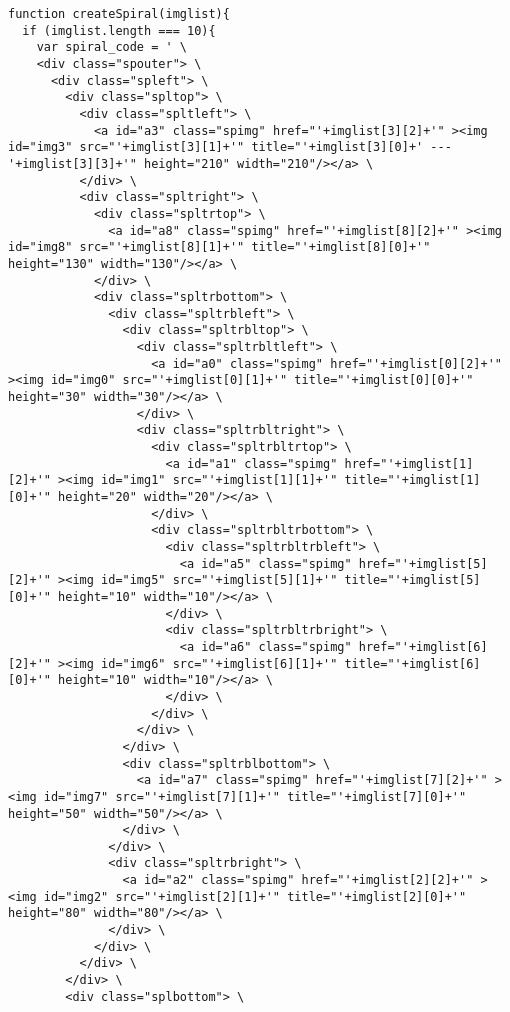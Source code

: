 \begin{verbatim}
function createSpiral(imglist){
  if (imglist.length === 10){
    var spiral_code = ' \
    <div class="spouter"> \
      <div class="spleft"> \
        <div class="spltop"> \
          <div class="spltleft"> \
            <a id="a3" class="spimg" href="'+imglist[3][2]+'" ><img id="img3" src="'+imglist[3][1]+'" title="'+imglist[3][0]+' --- '+imglist[3][3]+'" height="210" width="210"/></a> \
          </div> \
          <div class="spltright"> \
            <div class="spltrtop"> \
              <a id="a8" class="spimg" href="'+imglist[8][2]+'" ><img id="img8" src="'+imglist[8][1]+'" title="'+imglist[8][0]+'" height="130" width="130"/></a> \
            </div> \
            <div class="spltrbottom"> \
              <div class="spltrbleft"> \
                <div class="spltrbltop"> \
                  <div class="spltrbltleft"> \
                    <a id="a0" class="spimg" href="'+imglist[0][2]+'" ><img id="img0" src="'+imglist[0][1]+'" title="'+imglist[0][0]+'" height="30" width="30"/></a> \
                  </div> \
                  <div class="spltrbltright"> \
                    <div class="spltrbltrtop"> \
                      <a id="a1" class="spimg" href="'+imglist[1][2]+'" ><img id="img1" src="'+imglist[1][1]+'" title="'+imglist[1][0]+'" height="20" width="20"/></a> \
                    </div> \
                    <div class="spltrbltrbottom"> \
                      <div class="spltrbltrbleft"> \
                        <a id="a5" class="spimg" href="'+imglist[5][2]+'" ><img id="img5" src="'+imglist[5][1]+'" title="'+imglist[5][0]+'" height="10" width="10"/></a> \
                      </div> \
                      <div class="spltrbltrbright"> \
                        <a id="a6" class="spimg" href="'+imglist[6][2]+'" ><img id="img6" src="'+imglist[6][1]+'" title="'+imglist[6][0]+'" height="10" width="10"/></a> \
                      </div> \
                    </div> \
                  </div> \
                </div> \
                <div class="spltrblbottom"> \
                  <a id="a7" class="spimg" href="'+imglist[7][2]+'" ><img id="img7" src="'+imglist[7][1]+'" title="'+imglist[7][0]+'" height="50" width="50"/></a> \
                </div> \
              </div> \
              <div class="spltrbright"> \
                <a id="a2" class="spimg" href="'+imglist[2][2]+'" ><img id="img2" src="'+imglist[2][1]+'" title="'+imglist[2][0]+'" height="80" width="80"/></a> \
              </div> \
            </div> \
          </div> \
        </div> \
        <div class="splbottom"> \

\end{verbatim}
